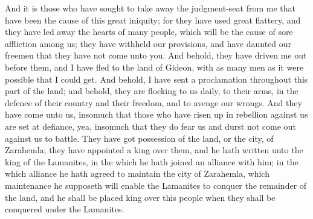 \bverse \iffalse And it is those who have sought to take away the judgment-seat from me that have been the cause of this great iniquity; for they have used great flattery, and they have led away the hearts of many people, which will be the cause of sore affliction among us; they have withheld our provisions, and have daunted our freemen that they have not come unto you. \fi
And it is those who have sought to take away the judgment-seat from me that have been the cause of this great iniquity; for they have used great flattery, and they have led away the hearts of many people, which will be the cause of sore affliction among us; they have withheld our provisions, and have daunted our freemen that they have not come unto you.
\bverse \iffalse And behold, they have driven me out before them, and I have fled to the land of Gideon, with as many men as it were possible that I could get. \fi
And behold, they have driven me out before them, and I have fled to the land of Gideon, with as many men as it were possible that I could get.
\bverse \iffalse And behold, I have sent a proclamation throughout this part of the land; and behold, they are flocking to us daily, to their arms, in the defence of their country and their freedom, and to avenge our wrongs. \fi
And behold, I have sent a proclamation throughout this part of the land; and behold, they are flocking to us daily, to their arms, in the defence of their country and their freedom, and to avenge our wrongs.
\bverse \iffalse And they have come unto us, insomuch that those who have risen up in rebellion against us are set at defiance, yea, insomuch that they do fear us and durst not come out against us to battle. \fi
And they have come unto us, insomuch that those who have risen up in rebellion against us are set at defiance, yea, insomuch that they do fear us and durst not come out against us to battle.
\bverse \iffalse They have got possession of the land, or the city, of Zarahemla; they have appointed a king over them, and he hath written unto the king of the Lamanites, in the which he hath joined an alliance with him; in the which alliance he hath agreed to maintain the city of Zarahemla, which maintenance he supposeth will enable the Lamanites to conquer the remainder of the land, and he shall be placed king over this people when they shall be conquered under the Lamanites. \fi
They have got possession of the land, or the city, of Zarahemla; they have appointed a king over them, and he hath written unto the king of the Lamanites, in the which he hath joined an alliance with him; in the which alliance he hath agreed to maintain the city of Zarahemla, which maintenance he supposeth will enable the Lamanites to conquer the remainder of the land, and he shall be placed king over this people when they shall be conquered under the Lamanites.
